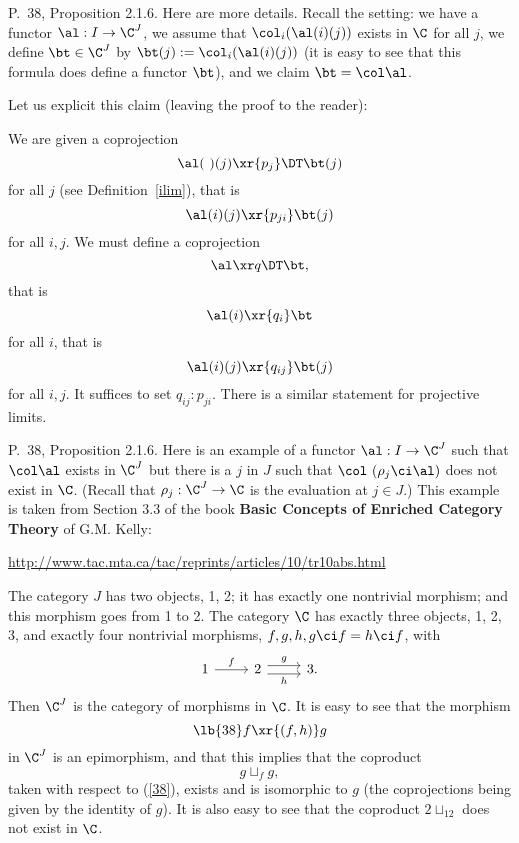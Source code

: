 \documentclass[12pt]{article}
\theoremstyle{remark}
\theoremstyle{definition}
\begin{document}
%

\begin{s}
P.~38, Proposition 2.1.6. Here are more details. Recall the setting: we have a functor $\al:I\to\C^J$, we assume that $\col_i(\al(i)(j))$ exists in $\C$ for all $j$, we define $\bt\in\C^J$ by $\bt(j):=\col_i(\al(i)(j))$ (it is easy to see that this formula does define a functor $\bt$), and we claim $\bt=\col\al$. 

Let us explicit this claim (leaving the proof to the reader):

We are given a coprojection
$$
\al(\ )(j)\xr{p_j}\DT\bt(j)
$$ 
for all $j$ (see Definition~\ref{ilim}), that is 
$$
\al(i)(j)\xr{p_{ji}}\bt(j)
$$ 
for all $i,j$. We must define a coprojection 
$$
\al\xr q\DT\bt,
$$ 
that is 
$$
\al(i)\xr{q_i}\bt
$$ 
for all $i$, that is 
$$
\al(i)(j)\xr{q_{ij}}\bt(j)
$$ 
for all $i,j$. It suffices to set $q_{ij}:p_{ji}$. There is a similar statement for projective limits.
\end{s}

%

\begin{s}
P.~38, Proposition 2.1.6. Here is an example of a functor $\al:I\to\C^J$ such that $\col\al$ exists in $\C^J$ but there is a $j$ in $J$ such that $\col\ (\rho_j\ci\al)$ does not exist in $\C$. (Recall that $\rho_j:\C^J\to\C$ is the evaluation at $j\in J$.) This example is taken from Section 3.3 of the book \textbf{Basic Concepts of Enriched Category Theory} of G.M. Kelly:%
%
\begin{center}\href{http://www.tac.mta.ca/tac/reprints/articles/10/tr10abs.html}{http://www.tac.mta.ca/tac/reprints/articles/10/tr10abs.html}
\end{center}

The category $J$ has two objects, 1, 2; it has exactly one nontrivial morphism; and this morphism goes from 1 to 2. The category $\C$ has exactly three objects, 1, 2, 3, and exactly four nontrivial morphisms, $f,g,h,g\ci f=h\ci f$, with 
$$
\begin{tikzcd}
1\ar{r}{f}&2\ar[yshift=.7ex]{r}{g}\ar[yshift=-.7ex]{r}[swap]{h}&3.
\end{tikzcd}
$$ 
Then $\C^J$ is the category of morphisms in $\C$. It is easy to see that the morphism 
%
\begin{equation}\lb{38}
f\xr{(f,h)}g 
\end{equation}
%
in $\C^J$ is an epimorphism, and that this implies that the coproduct 
$$
g\sqcup_fg,
$$ 
taken with respect to (\ref{38}), exists and is isomorphic to $g$ (the coprojections being given by the identity of $g$). It is also easy to see that the coproduct $2\sqcup_12$ does not exist in $\C$.
\end{s}
\end{document}
